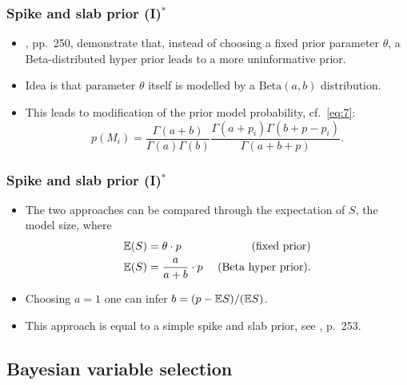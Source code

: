 \documentclass[xcolor=table,10pt]{beamer}
\begin{document}
\begin{frame}
  \frametitle{Spike and slab prior (I)$^\ast$}
  \begin{itemize}
  \item \citep{Fahrmeir2013}, pp.\ 250, demonstrate that, instead of
    choosing a fixed prior parameter $\theta$, a Beta-distributed
    hyper prior leads to a more uninformative prior.
  \item Idea is that parameter $\theta$ itself is modelled by
    a $\text{Beta}(a,b)$ distribution.
  \item This leads to modification of the prior model probability,
    cf.\ \eqref{eq:7}: 
    \begin{equation}
      \label{eq:8}
      p(M_i) = \frac{\Gamma(a+b)}{\Gamma(a) \Gamma(b)} \frac{\Gamma(a+p_i)
        \Gamma(b+p-p_i)} {\Gamma(a+b+p)}. 
    \end{equation}
  \end{itemize}
\end{frame}

\begin{frame}
  \frametitle{Spike and slab prior (I)$^\ast$}
  \begin{itemize}
\item The two approaches can be compared through the expectation of
    $S$, the model size, where
    \begin{align*}
      {\mathbb{E}}(S) &= \theta\cdot p&\text{ (fixed prior)}\\
      {\mathbb{E}}(S) &= \frac{a}{a+b}\cdot p&\text{ (Beta hyper prior)}.
    \end{align*}
  \item Choosing $a=1$ one can infer $b=(p-{\mathbb{E}} S)/({\mathbb{E}} S)$.
  \item This approach is equal to a simple \alert{spike and slab
      prior}, see \citep{Fahrmeir2013}, p.\ 253.
  \end{itemize}
\end{frame}


\subsection{Bayesian variable selection}
\end{document}
